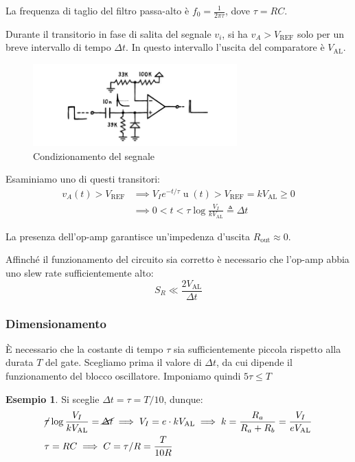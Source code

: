 \documentclass{article}
\newcommand{\var}[2]{#1_\text{#2}}
\DeclareMathOperator{\ustep}{u}
\theoremstyle{definition}
\newtheorem{example}{Esempio}
\begin{document}
La frequenza di taglio del filtro passa-alto è \(f_0 = \frac{1}{2 \pi \tau}\), dove \(\tau = RC\).

Durante il transitorio in fase di salita del segnale \(v_i\), si ha \(v_A > \var{V}{REF}\) solo per un breve intervallo di tempo \(\Delta t\).
In questo intervallo l'uscita del comparatore è \(\var{V}{AL}\).

\begin{figure}[htp]
    \centering
    \includegraphics[width=0.7\textwidth]{gatebase.png} 
    \caption{Condizionamento del segnale}
    \label{fig:gate-to-trigger-condizionamento}
\end{figure}

Esaminiamo uno di questi transitori:
\begin{align*}
    v_A(t) > \var{V}{REF} & \implies
    V_I e^{-t/\tau} \ustep(t) > \var{V}{REF} = k \var{V}{AL} \geq 0 \\
    & \implies 0 < t < \tau \log\frac{V_I}{k \var{V}{AL}} \triangleq \Delta t
    \label{eq:trigger-dt}
\end{align*}

La presenza dell'op-amp garantisce un'impedenza d'uscita \(\var{R}{out} \approx 0\).

Affinché il funzionamento del circuito sia corretto è necessario che l'op-amp abbia uno slew rate sufficientemente alto:
\begin{equation*}
    S_R \ll \frac{2 \var{V}{AL}}{\Delta t}
\end{equation*}

\subsubsection{Dimensionamento}
È necessario che la costante di tempo \(\tau\) sia sufficientemente piccola rispetto alla durata \(T\) del gate.
Scegliamo prima il valore di \(\Delta t\), da cui dipende il funzionamento del blocco oscillatore.
Imponiamo quindi \(5 \tau \le T\)

\begin{example}
    Si sceglie \(\Delta t = \tau = T/10\), dunque:
    \begin{align*}
        &\cancel{\tau} \log\frac{V_I}{k \var{V}{AL}} = \cancel{\Delta t} \implies
        V_I = e \cdot k \var{V}{AL} \implies
        k = \frac{R_a}{R_a + R_b} = \frac{V_I}{e \var{V}{AL}} \\
        &\tau = RC \implies C = \tau/R = \frac{T}{10R}
    \end{align*}
\end{example}
\end{document}
